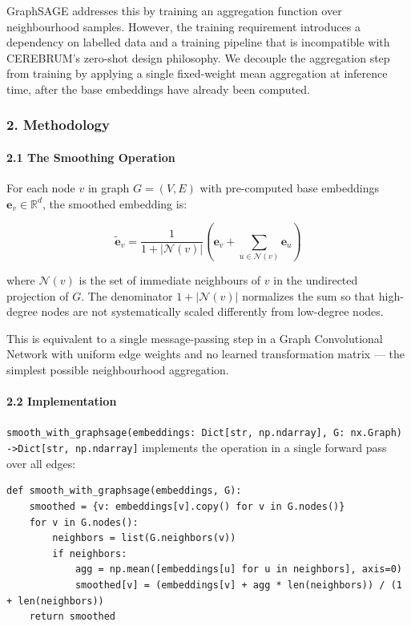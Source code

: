 GraphSAGE \cite{hamilton2017graphsage} addresses this by training an aggregation function over neigh\-bourhood samples. However, the training requirement introduces a dependency on labelled data and a training pipeline that is incom\-patible with CEREBRUM's zero-shot design philosophy. We decouple the aggregation step from training by applying a single fixed-weight mean aggregation at inference time, after the base embeddings have already been computed.

\subsubsection{2. Methodology}

\paragraph{2.1 The Smoothing Operation}
For each node $v$ in graph $G = (V, E)$ with pre-computed base embeddings $\mathbf{e}_v \in \mathbb{R}^d$, the smoothed embedding is:

\begin{equation}
\tilde{\mathbf{e}}_v = \frac{1}{1+|\mathcal{N}(v)|}\left(\mathbf{e}_v + \sum_{u \in \mathcal{N}(v)} \mathbf{e}_u\right)
\end{equation}

where $\mathcal{N}(v)$ is the set of immediate neighbours of $v$ in the undirected projection of $G$. The denominator $1 + |\mathcal{N}(v)|$ normalizes the sum so that high-degree nodes are not syste\-matically scaled differently from low-degree nodes.

This is equivalent to a single message-passing step in a Graph Convol\-utional Network \cite{velickovic2018gat} with uniform edge weights and no learned trans\-formation matrix — the simplest possible neigh\-bourhood aggregation.

\paragraph{2.2 Implem\-entation}
\texttt{smooth\_with\_graphsage(embeddings: Dict[str, np.ndarray], G: nx.Graph) -\textgreater  Dict[str, np.ndarray]} implements the operation in a single forward pass over all edges:

\begin{lstlisting}
def smooth_with_graphsage(embeddings, G):
    smoothed = {v: embeddings[v].copy() for v in G.nodes()}
    for v in G.nodes():
        neighbors = list(G.neighbors(v))
        if neighbors:
            agg = np.mean([embeddings[u] for u in neighbors], axis=0)
            smoothed[v] = (embeddings[v] + agg * len(neighbors)) / (1 + len(neighbors))
    return smoothed
\end{lstlisting}

